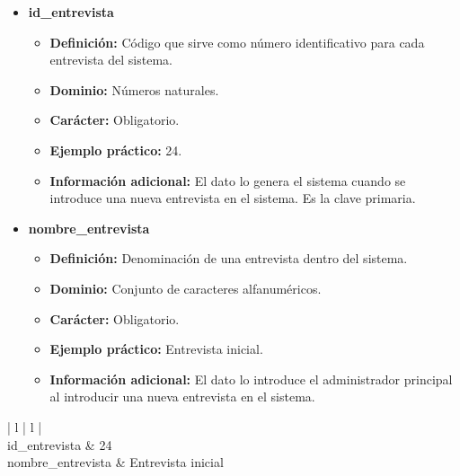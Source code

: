 \begin{description}
   \begin{itemize}
    \item \textbf{id\_entrevista}
      \begin{itemize}
         \item \textbf{Definición:} Código que sirve como número identificativo
               para cada entrevista del sistema.
         \item \textbf{Dominio:} Números naturales.
         \item \textbf{Carácter:} Obligatorio.
         \item \textbf{Ejemplo práctico:} 24.
         \item \textbf{Información adicional:} El dato lo genera el sistema
               cuando se introduce una nueva entrevista en el sistema. Es la
               clave primaria.
      \end{itemize}
   \item \textbf{nombre\_entrevista}
      \begin{itemize}
         \item \textbf{Definición:} Denominación de una entrevista dentro del
                sistema.
         \item \textbf{Dominio:} Conjunto de caracteres alfanuméricos.
         \item \textbf{Carácter:} Obligatorio.
         \item \textbf{Ejemplo práctico:} Entrevista inicial.
         \item \textbf{Información adicional:} El dato lo introduce el
         administrador principal al introducir una nueva entrevista en el
         sistema.
      \end{itemize}
   \end{itemize}

   \item[Ejemplos prácticos]

   \item \begin{center}
            \begin{tabular}{ | l | l | }
            \hline
             \\
            \hline
            id\_entrevista & 24 \\
            \hline
            nombre\_entrevista & Entrevista inicial \\
            \hline
            \end{tabular}
         \end{center}


\end{description}
